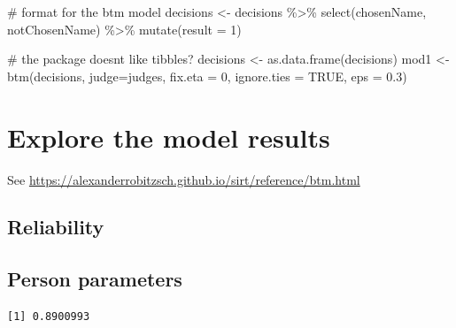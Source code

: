 \documentclass[
  letterpaper,
  DIV=11,
  numbers=noendperiod]{scrreprt}
\newenvironment{Shaded}{\begin{snugshade}}{\end{snugshade}}
\newcommand{\AttributeTok}[1]{\textcolor[rgb]{0.40,0.45,0.13}{#1}}
\newcommand{\CommentTok}[1]{\textcolor[rgb]{0.37,0.37,0.37}{#1}}
\newcommand{\ConstantTok}[1]{\textcolor[rgb]{0.56,0.35,0.01}{#1}}
\newcommand{\DecValTok}[1]{\textcolor[rgb]{0.68,0.00,0.00}{#1}}
\newcommand{\FloatTok}[1]{\textcolor[rgb]{0.68,0.00,0.00}{#1}}
\newcommand{\FunctionTok}[1]{\textcolor[rgb]{0.28,0.35,0.67}{#1}}
\newcommand{\NormalTok}[1]{\textcolor[rgb]{0.00,0.23,0.31}{#1}}
\newcommand{\OtherTok}[1]{\textcolor[rgb]{0.00,0.23,0.31}{#1}}
\newcommand{\SpecialCharTok}[1]{\textcolor[rgb]{0.37,0.37,0.37}{#1}}
\begin{document}
\begin{Shaded}
\begin{Highlighting}[]
\CommentTok{\# format for the btm model}
\NormalTok{decisions }\OtherTok{\textless{}{-}}\NormalTok{ decisions }\SpecialCharTok{\%\textgreater{}\%} 
  \FunctionTok{select}\NormalTok{(chosenName, notChosenName) }\SpecialCharTok{\%\textgreater{}\%} 
  \FunctionTok{mutate}\NormalTok{(}\AttributeTok{result =} \DecValTok{1}\NormalTok{)}

\CommentTok{\# the package doesn\textquotesingle{}t like tibbles?}
\NormalTok{decisions }\OtherTok{\textless{}{-}} \FunctionTok{as.data.frame}\NormalTok{(decisions)}
\NormalTok{mod1 }\OtherTok{\textless{}{-}} \FunctionTok{btm}\NormalTok{(decisions, }\AttributeTok{judge=}\NormalTok{judges, }\AttributeTok{fix.eta =} \DecValTok{0}\NormalTok{, }\AttributeTok{ignore.ties =} \ConstantTok{TRUE}\NormalTok{, }\AttributeTok{eps =} \FloatTok{0.3}\NormalTok{)}
\end{Highlighting}
\end{Shaded}

\hypertarget{explore-the-model-results}{%
\section{Explore the model results}\label{explore-the-model-results}}

See \url{https://alexanderrobitzsch.github.io/sirt/reference/btm.html}

\hypertarget{reliability-1}{%
\subsection{Reliability}\label{reliability-1}}

\hypertarget{person-parameters}{%
\subsection{Person parameters}\label{person-parameters}}

\begin{Shaded}
\end{Shaded}

\begin{verbatim}
[1] 0.8900993
\end{verbatim}

\begin{Shaded}
\end{Shaded}
\end{document}
